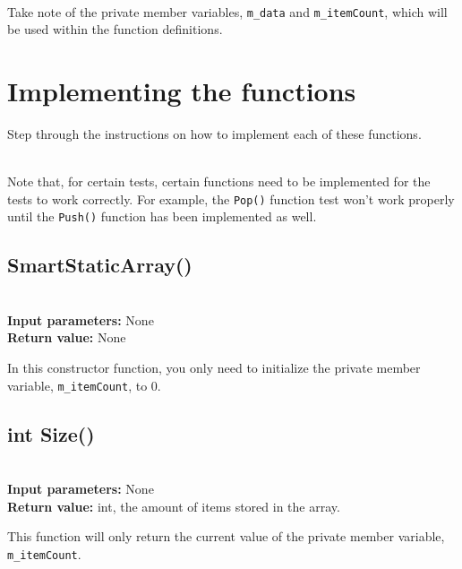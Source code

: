 \documentclass[a4paper,12pt]{book}
\begin{document}
        ~\\
        Take note of the private member variables,
        \texttt{m\_data} and \texttt{m\_itemCount},
        which will be used within the function definitions.

\newpage
\section*{Implementing the functions}

        Step through the instructions on how to implement each of these functions.
        
        ~\\
        Note that, for certain tests, certain functions need to be implemented
        for the tests to work correctly. For example, the \texttt{Pop()} function
        test won't work properly until the \texttt{Push()} function has
        been implemented as well.


    \subsection*{SmartStaticArray()}

    \begin{framed} ~\\
        \textbf{Input parameters:} None \\
        \textbf{Return value:} None
    \end{framed}

    In this constructor function, you only need to initialize the
    private member variable, \texttt{m\_itemCount}, to 0.

    \hrulefill
    \subsection*{int Size()}

    \begin{framed} ~\\
        \textbf{Input parameters:} None \\
        \textbf{Return value:} int, the amount of items stored in the array.
    \end{framed}

    This function will only return the current value of the
    private member variable, \texttt{m\_itemCount}.
    
    \hrulefill
\end{document}
